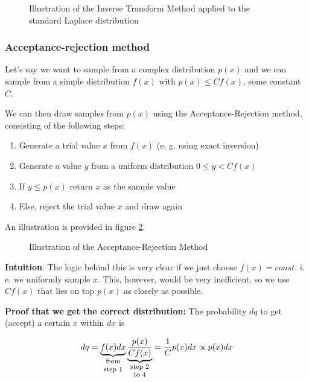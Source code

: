 \begin{figure}[!htb]
 \centering
 \hfill
 \caption{Illustration of the Inverse Transform Method applied to the standard Laplace distribution}
 \label{fig:discrete_transform}
\end{figure}

\subsubsection{Acceptance-rejection method}
Let's say we want to sample from a complex distribution $p(x)$ and we can sample from a simple distribution $f(x)$ with
$p(x) \leq C f(x)$, some constant $C$.

We can then draw samples from $p(x)$ using the Acceptance-Rejection method, consisting of the following steps:
\begin{enumerate}
    \item Generate a trial value $x$ from $f(x)$ (e. g. using exact inversion)
    \item Generate a value $y$ from a uniform distribution $0\leq y<C f(x)$
    \item If $y\leq p(x)$ return $x$ as the sample value
    \item Else, reject the trial value $x$ and draw again
\end{enumerate}

An illustration is provided in figure \ref{fig:acceptance_rejection}.

\begin{figure}[!htb]
 \centering
 \hfill
 \caption{Illustration of the Acceptance-Rejection Method}
 \label{fig:acceptance_rejection}
\end{figure}
 
\textbf{Intuition}: The logic behind this is very clear if we just choose $f(x)=const$. i. e. we uniformly sample $x$. This, however, would be very inefficient, so we use $ C f(x)$ that lies on top $p(x)$ as closely as possible.
\par
\textbf{Proof that we get the correct distribution:} The probability $dq$ to get (accept) a certain $x$ within $dx$ is

\begin{equation}
    dq = \explain{f(x) dx}{from step 1} \explain{\frac{p(x)}{C f(x)}}{step 2 to 4} = \frac{1}{C} p(x) dx \propto p(x) dx
\end{equation}

